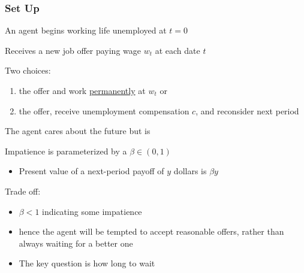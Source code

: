 \begin{frame}
    \frametitle{Set Up}
    
    An agent begins working life unemployed at $t=0$ 

            \vspace{0.5em}
    Receives a new job offer paying wage $w_t$ at each date $t$  
            \vspace{0.5em}
            \vspace{0.5em}

    Two choices:
    \begin{enumerate}
        \item {} the offer and work \underline{permanently} at $w_t$ or
            \vspace{0.5em}
            \vspace{0.5em}
        \item {} the offer, receive unemployment compensation $c$, and reconsider next period
    \end{enumerate}


\end{frame}



\begin{frame}

    The agent cares about the future but is 

            \vspace{0.5em}
    Impatience is parameterized by a  $\beta \in (0, 1)$

            \vspace{0.5em}
    \begin{itemize}
        \item Present value of a next-period payoff of $y$ dollars is $\beta y$
    \end{itemize}

            \vspace{0.5em}
            \vspace{0.5em}
    Trade off:
    \begin{itemize}
        \item $\beta < 1$ indicating some impatience
            \vspace{0.5em}
        \item hence the agent will be
            tempted to accept reasonable offers, rather than always waiting
            for a better one
            \vspace{0.5em}
        \item The key question is how long to wait
    \end{itemize}
   
\end{frame}


